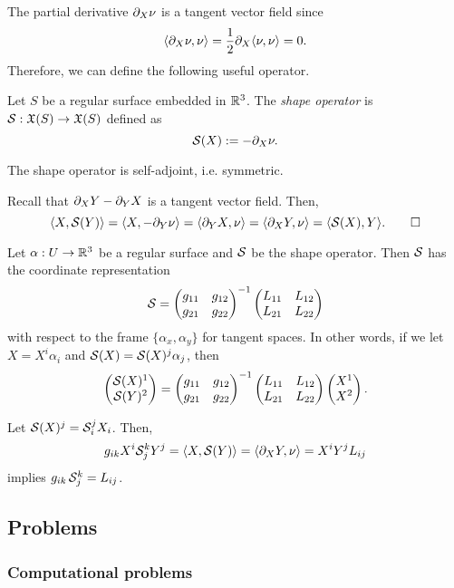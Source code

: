 \documentclass{../exp}
\def\a{\alpha}
\begin{document}
The partial derivative $\pd_X\nu$ is a tangent vector field since
\[\<\pd_X\nu,\nu\>=\frac12\pd_X\<\nu,\nu\>=0.\]
Therefore, we can define the following useful operator.
\begin{defn}
Let $S$ be a regular surface embedded in $\mathbb{R}^3$.
The \emph{shape operator} is $\cS:\fX(S)\to\fX(S)$ defined as
\[\cS(X):=-\pd_X\nu.\]
\end{defn}
\begin{prop}
The shape operator is self-adjoint, i.e. symmetric.
\end{prop}
\begin{pf}
Recall that $\pd_XY-\pd_YX$ is a tangent vector field.
Then,
\[\<X,\cS(Y)\>=\<X,-\pd_Y\nu\>=\<\pd_YX,\nu\>=\<\pd_XY,\nu\>=\<\cS(X),Y\>.\qedhere\]
\end{pf}


\begin{thm}
Let $\a:U\to\R^3$ be a regular surface and $\mathcal{S}$ be the shape operator.
Then $\mathcal{S}$ has the coordinate representation
\[\mathcal{S}=\begin{pmatrix}g_{11}&g_{12}\\g_{21}&g_{22}\end{pmatrix}^{-1}\begin{pmatrix}L_{11}&L_{12}\\L_{21}&L_{22}\end{pmatrix}\]
with respect to the frame $\{\a_x,\a_y\}$ for tangent spaces.
In other words, if we let $X=X^i\a_i$ and $\cS(X)=\cS(X)^j\a_j$, then
\[\begin{pmatrix}\mathcal{S}(X)^1\\\mathcal{S}(Y)^2\end{pmatrix}=\begin{pmatrix}g_{11}&g_{12}\\g_{21}&g_{22}\end{pmatrix}^{-1}\begin{pmatrix}L_{11}&L_{12}\\L_{21}&L_{22}\end{pmatrix}\begin{pmatrix}X^1\\X^2\end{pmatrix}.\]
\end{thm}
\begin{pf}
Let $\mathcal{S}(X)^j=\mathcal{S}_i^jX_i$.
Then,
\[g_{ik}X^i\cS_j^kY^j=\<X,\cS(Y)\>=\<\pd_XY,\nu\>=X^iY^jL_{ij}\]
implies $g_{ik}\,\mathcal{S}_j^k=L_{ij}$.
\end{pf}






\subsection{Problems}
\subsubsection{Computational problems}
\end{document}

